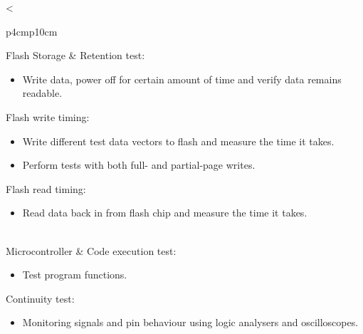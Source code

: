 \begin{longtable}{<{\raggedright}p{4cm}p{10cm}}
\midrule
 Flash Storage & Retention test:  
  \begin{itemize}
    \item Write data, power off for certain amount of time and verify data remains readable.  
\end{itemize} 
 Flash write timing: 
  \begin{itemize}
    \item Write different test data vectors to flash and measure the time it takes. 
    \item Perform tests with both full- and partial-page writes.
  \end{itemize}
 Flash read timing: 
  \begin{itemize}
    \item Read data back in from flash chip and measure the time it takes.
  \end{itemize} \\
\midrule
Microcontroller & Code execution test:  
  \begin{itemize}
    \item Test program functions. 
  \end{itemize} 
 Continuity test:  
 \begin{itemize}
  \item Monitoring signals and pin behaviour using logic analysers and oscilloscopes.
 \end{itemize}\\
 \bottomrule\\
 \caption{Proposed verification testing plan}\label{tbl:verification}
\end{longtable}

